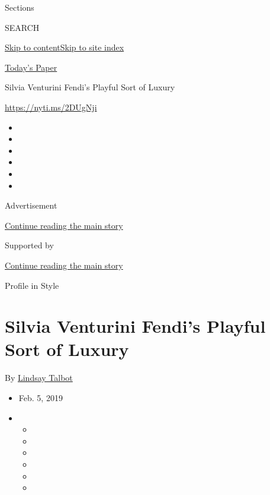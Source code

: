 Sections

SEARCH

\protect\hyperlink{site-content}{Skip to
content}\protect\hyperlink{site-index}{Skip to site index}

\href{https://myaccount.nytimes.com/auth/login?response_type=cookie\&client_id=vi}{}

\href{https://www.nytimes.com/section/todayspaper}{Today's Paper}

Silvia Venturini Fendi's Playful Sort of Luxury

\href{https://nyti.ms/2DUgNji}{https://nyti.ms/2DUgNji}

\begin{itemize}
\item
\item
\item
\item
\item
\item
\end{itemize}

Advertisement

\protect\hyperlink{after-top}{Continue reading the main story}

Supported by

\protect\hyperlink{after-sponsor}{Continue reading the main story}

Profile in Style

\hypertarget{silvia-venturini-fendis-playful-sort-of-luxury}{%
\section{Silvia Venturini Fendi's Playful Sort of
Luxury}\label{silvia-venturini-fendis-playful-sort-of-luxury}}

By \href{https://www.nytimes.com/by/lindsay-talbot}{Lindsay Talbot}

\begin{itemize}
\item
  Feb. 5, 2019
\item
  \begin{itemize}
  \item
  \item
  \item
  \item
  \item
  \item
  \end{itemize}
\end{itemize}

